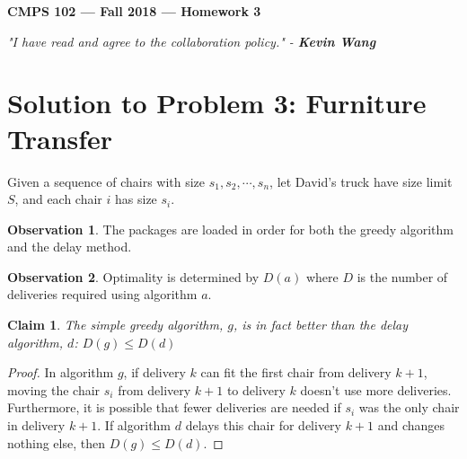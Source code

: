 \documentclass[11pt]{article}
\theoremstyle{definition}
\newtheorem{observation}{Observation}
\theoremstyle{plain}
\newtheorem{claim}{Claim}
\theoremstyle{indented-remark}
\theoremstyle{indented-proof}
\begin{document}
\begin{center}
{\bf\Large CMPS 102 --- Fall 2018 ---  Homework 3}
\end{center}

\begin{center}
\textit{"I have read and agree to the collaboration policy." - \textbf{Kevin Wang}}
\end{center}

\section*{Solution to Problem 3: Furniture Transfer}

Given a sequence of chairs with size $s_{1}, s_{2}, \dotsb , s_{n}$, let David's truck have size limit $S$, and each chair $i$ has size $s_{i}$. 

\begin{observation}
The packages are loaded in order for both the greedy algorithm and the delay method.
\end{observation}

\begin{observation}
Optimality is determined by $D(a)$ where $D$ is the number of deliveries required using algorithm $a$.
\end{observation}

\begin{claim}
The simple greedy algorithm, $g$, is in fact better than the delay algorithm, $d$: $D(g) \leq D(d)$ 
\end{claim}

\begin{proof}
In algorithm $g$, if delivery $k$ can fit the first chair from delivery $k+1$, moving the chair $s_{i}$ from delivery $k+1$ to delivery $k$ doesn't use more deliveries. Furthermore, it is possible that fewer deliveries are needed if $s_{i}$ was the only chair in delivery $k+1$. If algorithm $d$ delays this chair for delivery $k+1$ and changes nothing else, then $D(g) \leq D(d)$.
\end{proof}
\end{document}
